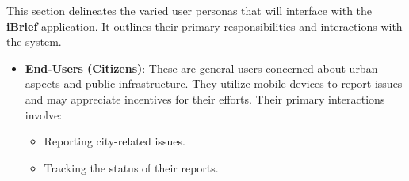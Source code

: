 This section delineates the varied user personas that will interface with the \textbf{iBrief} application. It outlines their primary responsibilities and interactions with the system.

\begin{itemize}
    \item \textbf{End-Users (Citizens)}: These are general users concerned about urban aspects and public infrastructure. They utilize mobile devices to report issues and may appreciate incentives for their efforts. Their primary interactions involve:
        \begin{itemize}
            \item Reporting city-related issues.
            \item Tracking the status of their reports.
        \end{itemize}


\end{itemize}
